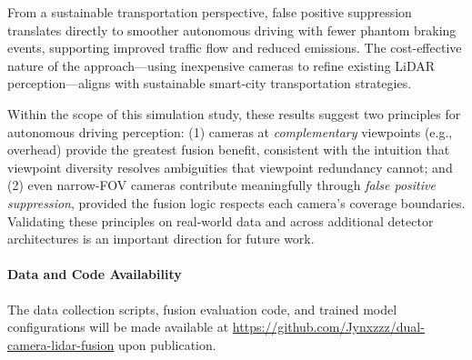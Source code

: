\documentclass[sustainability,article,submit,moreauthors,pdftex]{Definitions/mdpi}
\begin{document}
From a sustainable transportation perspective, false positive suppression translates directly to smoother autonomous driving with fewer phantom braking events, supporting improved traffic flow and reduced emissions. The cost-effective nature of the approach---using inexpensive cameras to refine existing LiDAR perception---aligns with sustainable smart-city transportation strategies.

Within the scope of this simulation study, these results suggest two principles for autonomous driving perception: (1) cameras at \emph{complementary} viewpoints (e.g., overhead) provide the greatest fusion benefit, consistent with the intuition that viewpoint diversity resolves ambiguities that viewpoint redundancy cannot; and (2) even narrow-FOV cameras contribute meaningfully through \emph{false positive suppression}, provided the fusion logic respects each camera's coverage boundaries. Validating these principles on real-world data and across additional detector architectures is an important direction for future work.


\vspace{6pt}





\paragraph{Data and Code Availability} The data collection scripts, fusion evaluation code, and trained model configurations will be made available at \url{https://github.com/Jynxzzz/dual-camera-lidar-fusion} upon publication.
\end{document}
